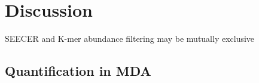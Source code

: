 \section{Discussion}

SEECER and K-mer abundance filtering may be mutually exclusive

\subsection{Quantification in MDA}







